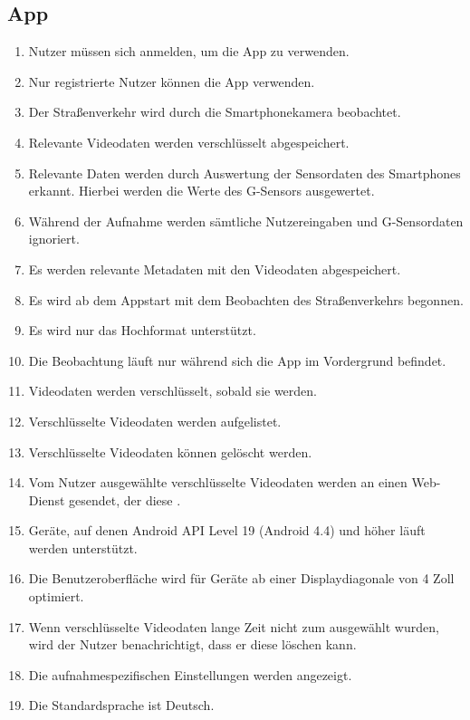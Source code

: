 \subsection{App}
	\begin{enumerate}
	\renewcommand{\labelenumi}{\textbf{\theenumi}}
	\renewcommand{\theenumi}{PK\arabic{enumi}0}
	\setcounter{enumi}{99}
	\item Nutzer müssen sich anmelden, um die \gls{App} zu verwenden.
	\item Nur registrierte Nutzer können die \gls{App} verwenden.
	\item Der Straßenverkehr wird durch die \gls{Smartphone}kamera beobachtet.
	\item Relevante Videodaten werden verschlüsselt abgespeichert.
	\item Relevante Daten werden durch Auswertung der Sensordaten des \glspl{Smartphone} erkannt. Hierbei werden die Werte des G-Sensors ausgewertet.
	\item Während der Aufnahme werden sämtliche Nutzereingaben und \gls{G-Sensor}daten ignoriert.
	\item Es werden relevante \gls{Metadaten} mit den Videodaten abgespeichert.
	\item Es wird ab dem \gls{App}start mit dem Beobachten des Straßenverkehrs begonnen.
	\item Es wird nur das Hochformat unterstützt.
	\item Die Beobachtung läuft nur während sich die \gls{App} im Vordergrund befindet.
	\item Videodaten werden verschlüsselt, sobald sie  werden.
	\item Verschlüsselte Videodaten werden aufgelistet.
	\item Verschlüsselte Videodaten können gelöscht werden.
	\item Vom Nutzer ausgewählte verschlüsselte Videodaten werden an einen \gls{Web-Dienst} gesendet, der diese .
	\item Geräte, auf denen \gls{Android} \gls{API} Level 19 (Android 4.4) und höher läuft werden unterstützt.
	\item Die Benutzeroberfläche wird für Geräte ab einer Displaydiagonale von 4 Zoll optimiert.
	\item Wenn verschlüsselte Videodaten lange Zeit nicht zum  ausgewählt wurden, wird der Nutzer benachrichtigt, dass er diese löschen kann.
	\item Die aufnahmespezifischen Einstellungen werden angezeigt.
	\item Die Standardsprache ist Deutsch.
	\end{enumerate}
